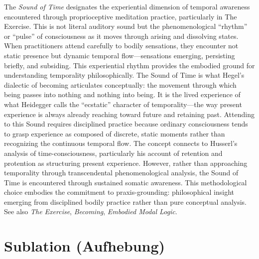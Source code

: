 \documentclass{book}
\begin{document}
The \textit{Sound of Time} designates the experiential dimension of temporal awareness encountered through proprioceptive meditation practice, particularly in The Exercise. This is not literal auditory sound but the phenomenological ``rhythm'' or ``pulse'' of consciousness as it moves through arising and dissolving states. When practitioners attend carefully to bodily sensations, they encounter not static presence but dynamic temporal flow---sensations emerging, persisting briefly, and subsiding. This experiential rhythm provides the embodied ground for understanding temporality philosophically. The Sound of Time is what Hegel's dialectic of becoming articulates conceptually: the movement through which being passes into nothing and nothing into being. It is the lived experience of what Heidegger calls the ``ecstatic'' character of temporality---the way present experience is always already reaching toward future and retaining past. Attending to this Sound requires disciplined practice because ordinary consciousness tends to grasp experience as composed of discrete, static moments rather than recognizing the continuous temporal flow. The concept connects to Husserl's analysis of time-consciousness, particularly his account of retention and protention as structuring present experience. However, rather than approaching temporality through transcendental phenomenological analysis, the Sound of Time is encountered through sustained somatic awareness. This methodological choice embodies the commitment to praxis-grounding: philosophical insight emerging from disciplined bodily practice rather than pure conceptual analysis. See also \textit{The Exercise}, \textit{Becoming}, \textit{Embodied Modal Logic}.

\section{Sublation (Aufhebung)}
\end{document}
